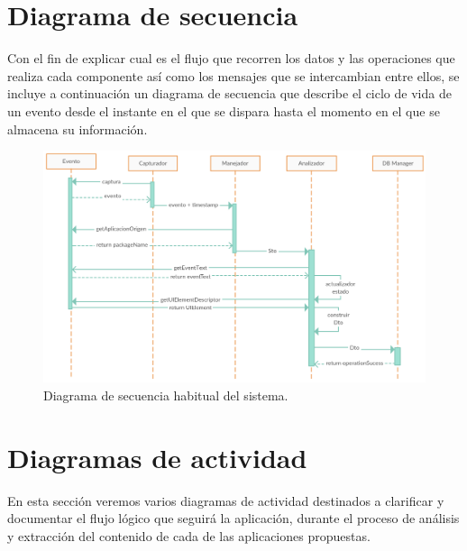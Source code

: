 \documentclass[12pt,a4paper,oneside]{book} %
\begin{document}
\section{Diagrama de secuencia}
Con el fin de explicar cual es el flujo que recorren los datos y las operaciones que realiza cada componente así como los mensajes que se intercambian entre ellos, se incluye a continuación un diagrama de secuencia que describe el ciclo de vida de un evento desde el instante en el que se dispara hasta el momento en el que se almacena su información. 
\begin{landscape}
\begin{figure}[htb]
  \begin{center}
     \includegraphics[width=1.5\textwidth]{pictures/secuencediagrams/diagrama_seq_flujo.png}
  \end{center}
  \caption[Diagrama de secuencia]{Diagrama de secuencia habitual del sistema.}
    \label{fig:LandscapeFigure}
\end{figure}
\end{landscape}
\section{Diagramas de actividad}
En esta sección veremos varios diagramas de actividad destinados a clarificar y documentar el flujo lógico que seguirá la aplicación, durante el proceso de análisis y extracción del contenido de cada de las aplicaciones propuestas. 
\end{document}

